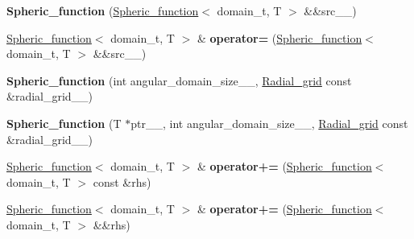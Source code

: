 \begin{DoxyCompactItemize}
\item 
\hypertarget{classsirius_1_1_spheric__function_af1269bbc034734e9af499efc4802cd8d}{}{\bfseries Spheric\+\_\+function} (\hyperlink{classsirius_1_1_spheric__function}{Spheric\+\_\+function}$<$ domain\+\_\+t, T $>$ \&\&src\+\_\+\+\_\+)\label{classsirius_1_1_spheric__function_af1269bbc034734e9af499efc4802cd8d}

\item 
\hypertarget{classsirius_1_1_spheric__function_ac8913f58e561dab6654314d00119e787}{}\hyperlink{classsirius_1_1_spheric__function}{Spheric\+\_\+function}$<$ domain\+\_\+t, T $>$ \& {\bfseries operator=} (\hyperlink{classsirius_1_1_spheric__function}{Spheric\+\_\+function}$<$ domain\+\_\+t, T $>$ \&\&src\+\_\+\+\_\+)\label{classsirius_1_1_spheric__function_ac8913f58e561dab6654314d00119e787}

\item 
\hypertarget{classsirius_1_1_spheric__function_a0ea451423d9d0c557e55c731a5e3c337}{}{\bfseries Spheric\+\_\+function} (int angular\+\_\+domain\+\_\+size\+\_\+\+\_\+, \hyperlink{classsirius_1_1_radial__grid}{Radial\+\_\+grid} const \&radial\+\_\+grid\+\_\+\+\_\+)\label{classsirius_1_1_spheric__function_a0ea451423d9d0c557e55c731a5e3c337}

\item 
\hypertarget{classsirius_1_1_spheric__function_acb3cfe743559c1817ccc753de0e120d3}{}{\bfseries Spheric\+\_\+function} (T $\ast$ptr\+\_\+\+\_\+, int angular\+\_\+domain\+\_\+size\+\_\+\+\_\+, \hyperlink{classsirius_1_1_radial__grid}{Radial\+\_\+grid} const \&radial\+\_\+grid\+\_\+\+\_\+)\label{classsirius_1_1_spheric__function_acb3cfe743559c1817ccc753de0e120d3}

\item 
\hypertarget{classsirius_1_1_spheric__function_ad019c78b2eeaf69091c81647a7c99bcd}{}\hyperlink{classsirius_1_1_spheric__function}{Spheric\+\_\+function}$<$ domain\+\_\+t, T $>$ \& {\bfseries operator+=} (\hyperlink{classsirius_1_1_spheric__function}{Spheric\+\_\+function}$<$ domain\+\_\+t, T $>$ const \&rhs)\label{classsirius_1_1_spheric__function_ad019c78b2eeaf69091c81647a7c99bcd}

\item 
\hypertarget{classsirius_1_1_spheric__function_a994955d74ffb87455e027d4de0e0584b}{}\hyperlink{classsirius_1_1_spheric__function}{Spheric\+\_\+function}$<$ domain\+\_\+t, T $>$ \& {\bfseries operator+=} (\hyperlink{classsirius_1_1_spheric__function}{Spheric\+\_\+function}$<$ domain\+\_\+t, T $>$ \&\&rhs)\label{classsirius_1_1_spheric__function_a994955d74ffb87455e027d4de0e0584b}


\end{DoxyCompactItemize}
